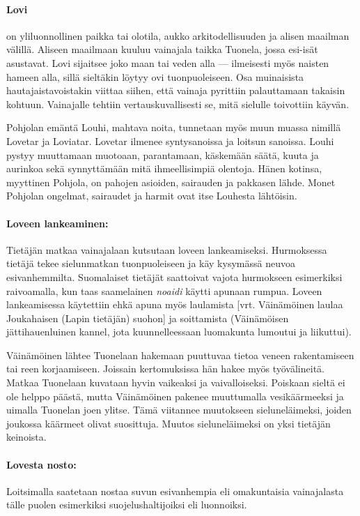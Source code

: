   \paragraph{Lovi} on yliluonnollinen paikka tai olotila, aukko arkitodellisuuden ja alisen
    maailman välillä. Aliseen maailmaan kuuluu vainajala taikka Tuonela, jossa esi-isät asustavat.
    Lovi sijaitsee joko maan tai veden alla --- ilmeisesti myös naisten hameen alla, sillä
    sieltäkin löytyy ovi tuonpuoleiseen. Osa muinaisista hautajaistavoistakin viittaa siihen, että
    vainaja pyrittiin palauttamaan takaisin kohtuun. Vainajalle tehtiin vertauskuvallisesti se,
    mitä sielulle toivottiin käyvän. \par
    Pohjolan emäntä Louhi, mahtava noita, tunnetaan myös muun muassa nimillä Lovetar ja Loviatar.
    Lovetar ilmenee syntysanoissa ja loitsun sanoissa. Louhi pystyy muuttamaan muotoaan,
    parantamaan, käskemään säätä, kuuta ja aurinkoa sekä synnyttämään mitä ihmeellisimpiä olentoja.
    Hänen kotinsa, myyttinen Pohjola, on pahojen asioiden, sairauden ja pakkasen lähde. Monet
    Pohjolan ongelmat, sairaudet ja harmit ovat itse Louhesta lähtöisin.
  \paragraph{Loveen lankeaminen:} Tietäjän matkaa vainajalaan kutsutaan loveen lankeamiseksi.
    Hurmoksessa tietäjä tekee sielunmatkan tuonpuoleiseen ja käy kysymässä neuvoa esivanhemmilta.
    Suomalaiset tietäjät saattoivat vajota hurmokseen esimerkiksi raivoamalla, kun taas saamelainen
    \emph{noaidi} käytti apunaan rumpua. Loveen lankeamisessa käytettiin ehkä apuna myös laulamista
    [vrt. Väinämöinen laulaa Joukahaisen (Lapin tietäjän) suohon] ja soittamista (Väinämöisen
    jättihauenluinen kannel, jota kuunnelleessaan luomakunta lumoutui ja liikuttui). \par
    Väinämöinen lähtee Tuonelaan hakemaan puuttuvaa tietoa veneen rakentamiseen tai reen
    korjaamiseen. Joissain kertomuksissa hän hakee myös työvälineitä. Matkaa Tuonelaan
    kuvataan hyvin vaikeaksi ja vaivalloiseksi. Poiskaan sieltä ei ole helppo päästä, mutta
    Väinämöinen pakenee muuttumalla vesikäärmeeksi ja uimalla Tuonelan joen ylitse. Tämä
    viitannee muutokseen sieluneläimeksi, joiden joukossa käärmeet olivat suosittuja. Muutos
    sieluneläimeksi on yksi tietäjän keinoista.
  \paragraph{Lovesta nosto:} Loitsimalla saatetaan nostaa suvun esivanhempia eli omakuntaisia
    vainajalasta tälle puolen esimerkiksi suojelushaltijoiksi eli luonnoiksi.
